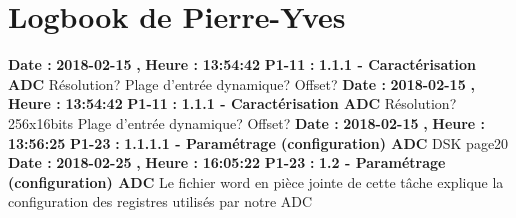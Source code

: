 \documentclass{article}%
\begin{document}
\section{Logbook de Pierre{-}Yves}%
\textbf{Date : }%
\textbf{2018{-}02{-}15}%
\textbf{,}%
\textbf{ Heure : }%
\textbf{13:54:42}%
\newline%
%
\textbf{P1{-}11 }%
\textbf{ : }%
\textbf{ 1.1.1 {-} Caractérisation ADC}%
\newline%
\newline%
%
Résolution?\newline%
Plage d'entrée dynamique?\newline%
Offset?\newline%
\newline%
%
\textbf{Date : }%
\textbf{2018{-}02{-}15}%
\textbf{,}%
\textbf{ Heure : }%
\textbf{13:54:42}%
\newline%
%
\textbf{P1{-}11 }%
\textbf{ : }%
\textbf{ 1.1.1 {-} Caractérisation ADC}%
\newline%
\newline%
%
Résolution? 256x16bits\newline%
Plage d'entrée dynamique?\newline%
Offset?\newline%
\newline%
%
\textbf{Date : }%
\textbf{2018{-}02{-}15}%
\textbf{,}%
\textbf{ Heure : }%
\textbf{13:56:25}%
\newline%
%
\textbf{P1{-}23 }%
\textbf{ : }%
\textbf{ 1.1.1.1 {-} Paramétrage (configuration) ADC}%
\newline%
\newline%
%
DSK page20\newline%
\newline%
%
\textbf{Date : }%
\textbf{2018{-}02{-}25}%
\textbf{,}%
\textbf{ Heure : }%
\textbf{16:05:22}%
\newline%
%
\textbf{P1{-}23 }%
\textbf{ : }%
\textbf{ 1.2 {-} Paramétrage (configuration) ADC}%
\newline%
\newline%
%
Le fichier word en pièce jointe de cette tâche explique la configuration des registres utilisés par notre ADC\newline%
\newline%
%
\newpage

%
\end{document}
